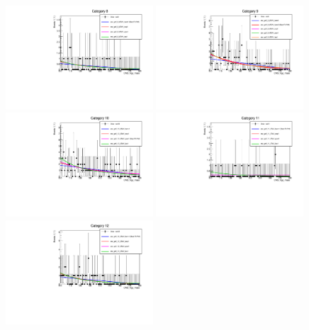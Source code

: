 \begin{figure}
  \includegraphics[width=0.49\textwidth]{analysis/plots/mva_8TeV/multipdf_cat8.pdf}
  \includegraphics[width=0.49\textwidth]{analysis/plots/mva_8TeV/multipdf_cat9.pdf}\\
  \includegraphics[width=0.49\textwidth]{analysis/plots/mva_8TeV/multipdf_cat10.pdf}
  \includegraphics[width=0.49\textwidth]{analysis/plots/mva_8TeV/multipdf_cat11.pdf}\\
  \includegraphics[width=0.49\textwidth]{analysis/plots/mva_8TeV/multipdf_cat12.pdf}

\end{figure}
